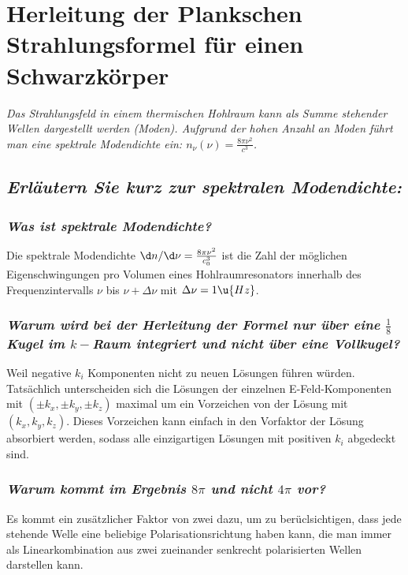 \documentclass[ex,minted]{exercise_4.0}
\begin{document}
\section{Herleitung der Plankschen Strahlungsformel für einen Schwarzkörper}
{\it Das Strahlungsfeld in einem thermischen Hohlraum kann als Summe stehender Wellen dargestellt werden (Moden). Aufgrund der hohen Anzahl an Moden führt man eine spektrale Modendichte ein: \(n_\nu (\nu) = \frac{8\pi \nu^2}{c^3}\).}

\subsection{\it Erläutern Sie kurz zur spektralen Modendichte:}
\begin{adjustwidth}{20pt}{}
    \subsubsection{\it Was ist spektrale Modendichte?}\vspace{2pt}
    \begin{adjustwidth}{20pt}{}
        Die spektrale Modendichte $\d n/\d\nu = \frac{8\pi\nu^2}{c_0^3}$ ist
        die Zahl der möglichen Eigenschwingungen pro Volumen eines Hohlraumresonators innerhalb des Frequenzintervalls \(\nu\) bis \(\nu+\Delta \nu\) mit \(\Delta \nu=1\u{Hz}\).
    \end{adjustwidth}
    
    \subsubsection{\it Warum wird bei der Herleitung der Formel nur über eine \(\frac18\) Kugel im \(k-\)Raum integriert und nicht über eine Vollkugel?}\vspace{2pt}
    Weil negative \(k_i\) Komponenten nicht zu neuen Lösungen führen würden. Tatsächlich unterscheiden sich die Lösungen der einzelnen E-Feld-Komponenten mit \((\pm k_x,\pm k_y,\pm k_z)\) maximal um ein Vorzeichen von der Lösung mit \((k_x,k_y,k_z)\). Dieses Vorzeichen kann einfach in den Vorfaktor der Lösung absorbiert werden, sodass alle einzigartigen Lösungen mit positiven \(k_i\) abgedeckt sind. 
    
    \subsubsection{\it Warum kommt im Ergebnis \(8\pi\) und nicht \(4\pi\) vor?}\vspace{2pt}
    \begin{adjustwidth}{20pt}{}
        Es kommt ein zusätzlicher Faktor von zwei dazu, um zu berüclsichtigen, dass jede stehende Welle eine
        beliebige Polarisationsrichtung haben kann, die man immer als Linearkombination aus zwei zueinander
        senkrecht polarisierten Wellen darstellen kann.
    \end{adjustwidth}
    
\end{adjustwidth}
\end{document}
